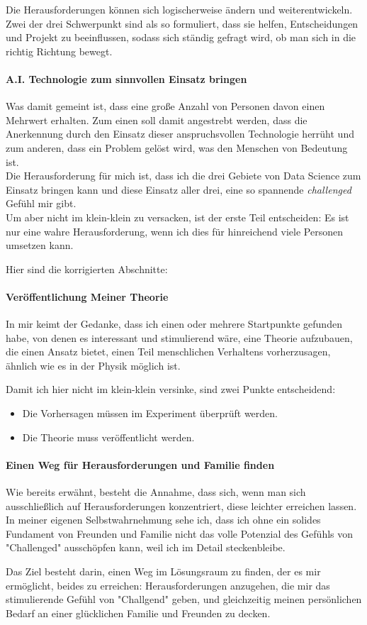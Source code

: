 Die Herausforderungen können sich  logischerweise ändern und weiterentwickeln. Zwei der drei Schwerpunkt sind als so formuliert, dass sie helfen, Entscheidungen und Projekt zu beeinflussen, sodass sich ständig gefragt wird, ob man sich in die richtig Richtung bewegt.\\

\paragraph{A.I. Technologie zum sinnvollen Einsatz bringen}
Was damit gemeint ist, dass eine große Anzahl von Personen davon einen Mehrwert erhalten. Zum einen soll damit angestrebt werden, dass die Anerkennung durch den Einsatz dieser anspruchsvollen Technologie herrüht und zum anderen, dass ein Problem gelöst wird, was den Menschen von Bedeutung ist.\\

Die Herausforderung für mich ist, dass ich die drei Gebiete von Data Science zum Einsatz bringen kann und diese Einsatz aller drei, eine so spannende \textit{challenged} Gefühl mir gibt.\\

Um aber nicht im klein-klein zu versacken, ist der erste Teil entscheiden: Es ist nur eine wahre Herausforderung, wenn ich dies für hinreichend viele Personen umsetzen kann.

Hier sind die korrigierten Abschnitte:

\paragraph{Veröffentlichung Meiner Theorie}
In mir keimt der Gedanke, dass ich einen oder mehrere Startpunkte gefunden habe, von denen es interessant und stimulierend wäre, eine Theorie aufzubauen, die einen Ansatz bietet, einen Teil menschlichen Verhaltens vorherzusagen, ähnlich wie es in der Physik möglich ist.

Damit ich hier nicht im klein-klein versinke, sind zwei Punkte entscheidend:
\begin{itemize}
    \item Die Vorhersagen müssen im Experiment überprüft werden.
    \item Die Theorie muss veröffentlicht werden.
\end{itemize}

\paragraph{Einen Weg für Herausforderungen und Familie finden}
Wie bereits erwähnt, besteht die Annahme, dass sich, wenn man sich ausschließlich auf Herausforderungen konzentriert, diese leichter erreichen lassen. In meiner eigenen Selbstwahrnehmung sehe ich, dass ich ohne ein solides Fundament von Freunden und Familie nicht das volle Potenzial des Gefühls von "Challenged" ausschöpfen kann, weil ich im Detail steckenbleibe.

Das Ziel besteht darin, einen Weg im Lösungsraum zu finden, der es mir ermöglicht, beides zu erreichen: Herausforderungen anzugehen, die mir das stimulierende Gefühl von "Challgend" geben, und gleichzeitig meinen persönlichen Bedarf an einer glücklichen Familie und Freunden zu decken.
